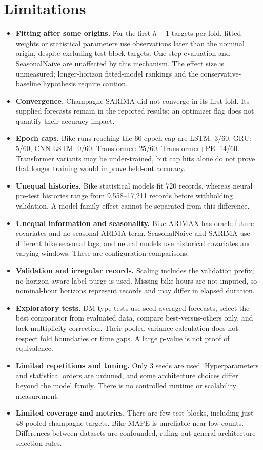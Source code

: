 \documentclass[10pt,a4paper]{article}
\begin{document}
\section{Limitations}
\begin{itemize}[leftmargin=*,itemsep=4pt]
\item \textbf{Fitting after some origins.} For the first $h-1$ targets per fold, fitted weights or statistical parameters use observations later than the nominal origin, despite excluding test-block targets. One-step evaluation and SeasonalNaive are unaffected by this mechanism. The effect size is unmeasured; longer-horizon fitted-model rankings and the conservative-baseline hypothesis require caution.
\item \textbf{Convergence.} Champagne SARIMA did not converge in its first fold. Its supplied forecasts remain in the reported results; an optimizer flag does not quantify their accuracy impact.
\item \textbf{Epoch caps.} Bike runs reaching the 60-epoch cap are LSTM: 3/60, GRU: 5/60, CNN-LSTM: 0/60, Transformer: 25/60, Transformer+PE: 14/60. Transformer variants may be under-trained, but cap hits alone do not prove that longer training would improve held-out accuracy.
\item \textbf{Unequal histories.} Bike statistical models fit 720 records, whereas neural pre-test histories range from 9,558--17,211 records before withholding validation. A model-family effect cannot be separated from this difference.
\item \textbf{Unequal information and seasonality.} Bike ARIMAX has oracle future covariates and no seasonal ARIMA term. SeasonalNaive and SARIMA use different bike seasonal lags, and neural models use historical covariates and varying windows. These are configuration comparisons.
\item \textbf{Validation and irregular records.} Scaling includes the validation prefix; no horizon-aware label purge is used. Missing bike hours are not imputed, so nominal-hour horizons represent records and may differ in elapsed duration.
\item \textbf{Exploratory tests.} DM-type tests use seed-averaged forecasts, select the best comparator from evaluated data, compare best-versus-others only, and lack multiplicity correction. Their pooled variance calculation does not respect fold boundaries or time gaps. A large p-value is not proof of equivalence.
\item \textbf{Limited repetitions and tuning.} Only 3 seeds are used. Hyperparameters and statistical orders are untuned, and some architecture choices differ beyond the model family. There is no controlled runtime or scalability measurement.
\item \textbf{Limited coverage and metrics.} There are few test blocks, including just 48 pooled champagne targets. Bike MAPE is unreliable near low counts. Differences between datasets are confounded, ruling out general architecture-selection rules.
\end{itemize}
\end{document}
